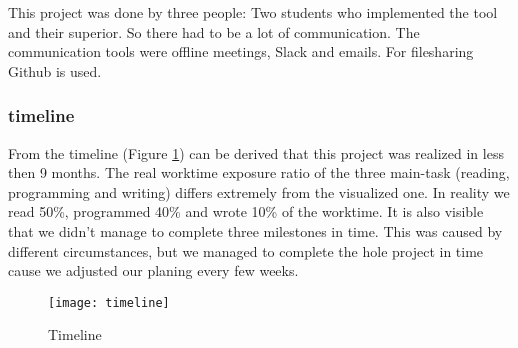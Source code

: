 
This project was done by three people: Two students who implemented the tool and their superior. So there had to be a lot of communication. The communication tools were offline meetings, Slack and emails. For filesharing Github is used.


\subsubsection*{timeline}
From the timeline (Figure \ref{fig:timeline}) can be derived that this project was realized in less then 9 months. The real worktime exposure ratio of the three main-task (reading, programming and writing) differs extremely from the visualized one. In reality we read 50\%, programmed 40\% and wrote 10\% of the worktime.
It is also visible that we didn't manage to complete three milestones in time. This was caused by different circumstances, but we managed to complete the hole project in time cause we adjusted our planing every few weeks.

\begin{figure}[!htb]
	\centering
		\texttt{[image: timeline]}
	\caption{Timeline}
	\label{fig:timeline}
\end{figure}



